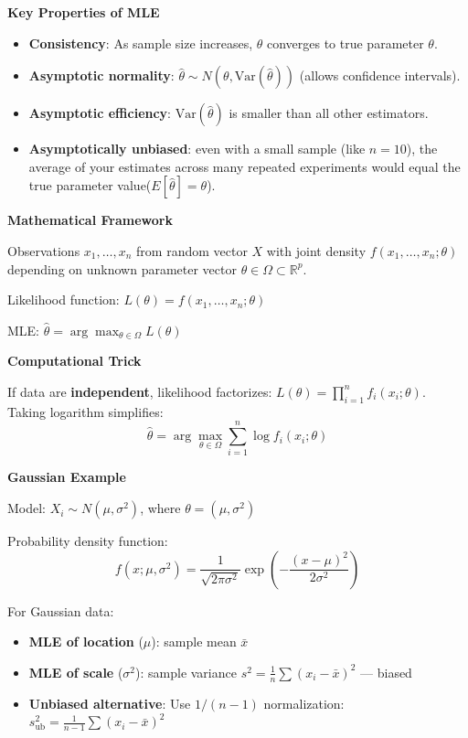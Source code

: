 \documentclass[12pt,a4paper]{article}
\begin{document}
\textbf{Key Properties of MLE}

\begin{itemize}
    \item \textbf{Consistency}: As sample size increases, $\hat{\theta}$ converges to true parameter $\theta$.
    \item \textbf{Asymptotic normality}: $\hat{\theta} \sim N(\theta, \text{Var}(\hat{\theta}))$ (allows confidence intervals).
    \item \textbf{Asymptotic efficiency}: $\text{Var}(\hat{\theta})$ is smaller than all other estimators.
    \item \textbf{Asymptotically unbiased}: even with a small sample (like $n=10$), the average of your estimates across many repeated experiments would equal the true parameter value($E[\hat{\theta}] = \theta$).
\end{itemize}

\vspace{0.5em}

\textbf{Mathematical Framework}

Observations $x_1, \ldots, x_n$ from random vector $X$ with joint density $f(x_1, \ldots, x_n; \theta)$ depending on unknown parameter vector $\theta \in \Omega \subset \mathbb{R}^p$.

Likelihood function: $L(\theta) = f(x_1, \ldots, x_n; \theta)$

MLE: $\hat{\theta} = \arg\max_{\theta \in \Omega} L(\theta)$

\vspace{0.5em}

\textbf{Computational Trick}

If data are \textbf{independent}, likelihood factorizes: $L(\theta) = \prod_{i=1}^n f_i(x_i; \theta)$. Taking logarithm simplifies:
\[
\hat{\theta} = \arg\max_{\theta \in \Omega} \sum_{i=1}^n \log f_i(x_i; \theta)
\]

\vspace{0.5em}

\textbf{Gaussian Example}

Model: $X_i \sim N(\mu, \sigma^2)$, where $\theta = (\mu, \sigma^2)$

Probability density function:
\[
f(x; \mu, \sigma^2) = \frac{1}{\sqrt{2\pi\sigma^2}} \exp\left(-\frac{(x-\mu)^2}{2\sigma^2}\right)
\]

For Gaussian data:
\begin{itemize}
    \item \textbf{MLE of location} ($\mu$): sample mean $\bar{x}$
    \item \textbf{MLE of scale} ($\sigma^2$): sample variance $s^2 = \frac{1}{n}\sum (x_i - \bar{x})^2$ — biased
    \item \textbf{Unbiased alternative}: Use $1/(n-1)$ normalization: $s^2_{\text{ub}} = \frac{1}{n-1}\sum (x_i - \bar{x})^2$
\end{itemize}
\end{document}

